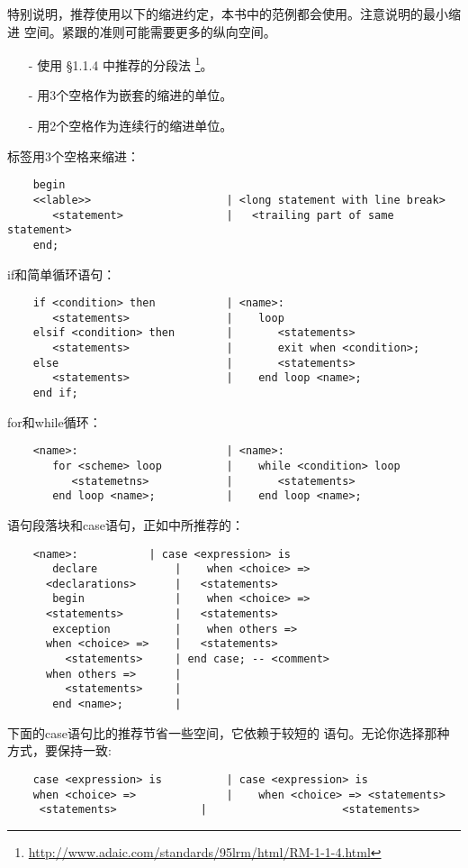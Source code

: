 \begin{blockindent}
特别说明，推荐使用以下的缩进约定，本书中的范例都会使用。注意说明的最小缩进
空间。紧跟的准则可能需要更多的纵向空间。
\begin{itemize}
    \item[-] 使用\cite{arm95} \S{}1.1.4 中推荐的分段法
\footnote{\url{http://www.adaic.com/standards/95lrm/html/RM-1-1-4.html}}。
    \item[-] 用3个空格作为嵌套的缩进的单位。
    \item[-] 用2个空格作为连续行的缩进单位。
\end{itemize}
标签用3个空格来缩进：
\begin{lstlisting}
    begin
    <<lable>>                     | <long statement with line break>
       <statement>                |   <trailing part of same statement>
    end;
\end{lstlisting}
if和简单循环语句：
\begin{lstlisting}
    if <condition> then           | <name>:
       <statements>               |    loop
    elsif <condition> then        |       <statements>
       <statements>               |       exit when <condition>;
    else                          |       <statements>
       <statements>               |    end loop <name>;
    end if;
\end{lstlisting}
for和while循环：
\begin{lstlisting}
    <name>:                       | <name>:
       for <scheme> loop          |    while <condition> loop
          <statemetns>            |       <statements>
       end loop <name>;           |    end loop <name>;
\end{lstlisting}
语句段落块和case语句，正如\cite{arm95}中所推荐的：
\begin{lstlisting}
    <name>:			  | case <expression> is
       declare			  |    when <choice> =>
	  <declarations>	  |	  <statements>
       begin			  |    when <choice> =>
	  <statements>		  |	  <statements>
       exception		  |    when others =>
	  when <choice> =>	  |	  <statements>
	     <statements>	  | end case; -- <comment>
	  when others =>	  |
	     <statements>	  |
       end <name>;		  |
\end{lstlisting}
下面的case语句比\cite{arm95}的推荐节省一些空间，它依赖于较短的
语句。无论你选择那种方式，要保持一致:
\begin{lstlisting}
    case <expression> is          | case <expression> is
    when <choice> =>              |    when <choice> => <statements>
	 <statements>             |                     <statements>

\end{lstlisting}
\end{blockindent}

